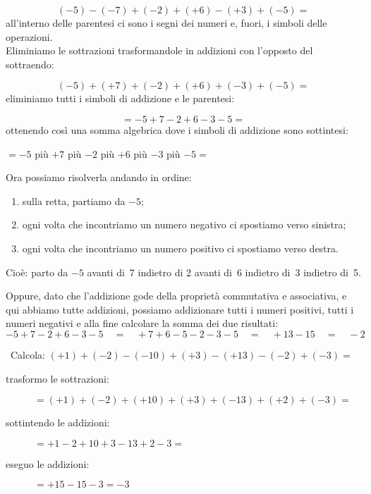 \vspace{-1em}
\[(-5)-(-7)+(-2)+(+6)-(+3)+(-5) =\]
all'interno delle parentesi ci sono i segni dei numeri e, fuori, i simboli 
delle operazioni.\\
Eliminiamo le sottrazioni trasformandole in addizioni 
con l'opposto del sottraendo:

\vspace{-1em}
\[(-5)+(+7)+(-2)+(+6)+(-3)+(-5) =\]
eliminiamo tutti i simboli di addizione e le parentesi: 

\vspace{-1em}
\[=-5+7-2+6-3-5 =\]
ottenendo così una somma algebrica dove i simboli di addizione sono 
sottintesi: 

\vspace{-1em}
\begin{center}
\(= -5\) \quad più \quad \(+7\) \quad più \quad \(-2\) \quad più \quad 
\(+6\) \quad più \quad \(-3\) \quad più \quad \(-5 =\)\\
\end{center}

Ora possiamo risolverla andando in ordine:
\begin{enumerate} [nosep]
\item sulla retta, partiamo da \(-5\);
\item ogni volta che incontriamo un numero negativo ci spostiamo verso 
sinistra; 
\item ogni volta che incontriamo un numero positivo ci spostiamo verso 
destra.
\end{enumerate}

\sommalgebrica

Cioè: parto da \(-5\) avanti di~7 indietro di 2 avanti di~6 indietro 
di~3 indietro di~5.

Oppure, dato che l'addizione gode della proprietà commutativa e associativa, 
e qui abbiamo tutte addizioni,
possiamo addizionare tutti i numeri positivi, tutti i numeri negativi e alla 
fine calcolare la somma dei due risultati:
\[-5+7-2+6-3-5 \quad=\quad +7+6-5-2-3-5 \quad=\quad +13 -15 \quad=\quad -2\]

\begin{esempio}{}{}
~Calcola: \((+1)+(-2)-(-10)+(+3)-(+13)-(-2)+(-3)=\) 
\begin{description}
\item [trasformo le sottrazioni: \quad ] 
\(=(+1)+(-2)+(+10)+(+3)+(-13)+(+2)+(-3)=\)
\item [sottintendo le addizioni: \quad ] \(=+1-2+10+3-13+2-3=\)
\item [eseguo le addizioni: \qquad ~~\, ] \(=+15-15-3=-3\)
\end{description}
\end{esempio}

